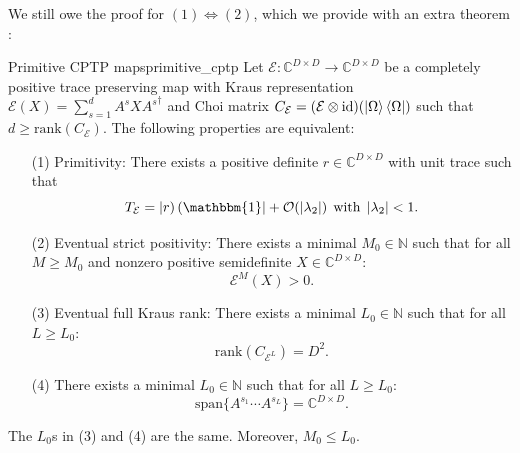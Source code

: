 \noindent We still owe the proof for $(1) \Leftrightarrow (2)$, which we provide with an extra theorem \cite{wolf2012channels}:
\begin{theorem}{Primitive CPTP maps}{primitive_cptp}
Let $\mathcal{E}: \mathbb{C}^{D \times D} \rightarrow \mathbb{C}^{D \times D}$ be a completely positive trace preserving map with Kraus representation $\mathcal{E}(X) = \sum_{s=1}^d A^s X {A^s}^{\dagger}$ and Choi matrix $C_{\mathcal{E}} = (\mathcal{E} \otimes \mathrm{id})(\ket{\Omega}\bra{\Omega})$ such that $d \geq \mathrm{rank}(C_{\mathcal{E}})$. The following properties are equivalent:
\begin{enumerate}
	\item[(1)] Primitivity: There exists a positive definite $r \in \mathbb{C}^{D \times D}$ with unit trace such that
	\begin{equation}
		T_{\mathcal{E}} = \tket{r}\tbra{\mathbbm{1}} + \mathcal{O}(\vert \lambda_2 \vert) \:\:\mathrm{with}\:\: \vert \lambda_2 \vert < 1.
	\end{equation}
	
	\item[(2)] Eventual strict positivity: There exists a minimal $M_0 \in \mathbb{N}$ such that for all $M \geq M_0$ and nonzero positive semidefinite $X \in \mathbb{C}^{D \times D}$: 
	\begin{equation}
		\mathcal{E}^M(X) > 0.
	\end{equation}
	
	\item[(3)] Eventual full Kraus rank: There exists a minimal $L_0 \in \mathbb{N}$ such that for all $L \geq L_0$: 
	\begin{equation}
		\mathrm{rank}(C_{\mathcal{E}^L}) = D^2.
	\end{equation}
	\item[(4)] There exists a minimal $L_0 \in \mathbb{N}$ such that for all $L \geq L_0$: 
	\begin{equation}
		\mathrm{span}\{A^{s_1}\cdots A^{s_L}\} = \mathbb{C}^{D \times D}.
	\end{equation}
\end{enumerate}
The $L_0$s in (3) and (4) are the same. Moreover, $M_0 \leq L_0$.
\end{theorem}
